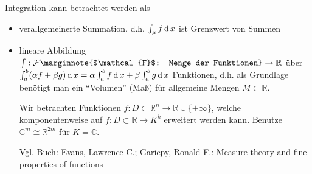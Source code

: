 Integration kann betrachtet werden als
\begin{itemize}
	\item verallgemeinerte Summation, d.h. $\int_\mu f\operatorname{d} x$ ist Grenzwert von Summen
	\item lineare Abbildung $\int: \mathcal{F}\marginnote{$\mathcal{F}$: Menge der Funktionen}\to \mathbb{R}$ über $\int_a^b (\alpha f + \beta g)\operatorname{d} x = \alpha \int_a^b f \operatorname{d} x + \beta \int_a^b g \operatorname{d} x$ Funktionen, d.h. als Grundlage benötigt man ein "`Volumen"' (Maß) für allgemeine Mengen $M\subset\mathbb{R}$.
	
	Wir betrachten Funktionen $f:D\subset\mathbb{R}^n\to \mathbb{R}\cup \{ \pm \infty \}$, welche komponentenweise auf $f:D\subset\mathbb{R}\to K^k$ erweitert werden kann. Benutze $\mathbb{C}^m \cong \mathbb{R}^{2m}$ für $K=\mathbb{C}$.
	
	Vgl. Buch:  Evans, Lawrence C.; Gariepy, Ronald F.: Measure theory and fine properties of functions
\end{itemize}